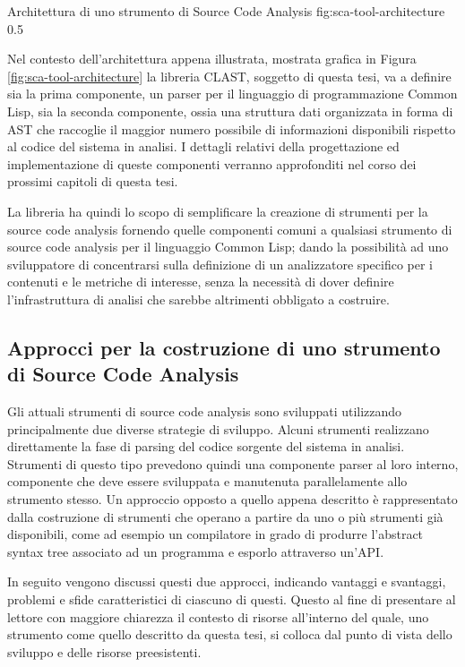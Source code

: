       {Architettura di uno strumento di Source Code Analysis}
      {fig:sca-tool-architecture}
      {0.5}

Nel contesto dell'architettura appena illustrata, mostrata grafica in Figura
\ref{fig:sca-tool-architecture} la libreria CLAST, soggetto di questa tesi, va a
definire sia la prima componente, un parser per il linguaggio di programmazione
Common Lisp, sia la seconda componente, ossia una struttura dati organizzata in
forma di AST che raccoglie il maggior numero possibile di informazioni
disponibili rispetto al codice del sistema in analisi. I dettagli relativi della
progettazione ed implementazione di queste componenti verranno approfonditi nel
corso dei prossimi capitoli di questa tesi.

La libreria ha quindi lo scopo di semplificare la creazione di strumenti per la
source code analysis fornendo quelle componenti comuni a qualsiasi strumento di
source code analysis per il linguaggio Common Lisp; dando la possibilità ad uno
sviluppatore di concentrarsi sulla definizione di un analizzatore specifico per
i contenuti e le metriche di interesse, senza la necessità di dover definire
l'infrastruttura di analisi che sarebbe altrimenti obbligato a costruire.

\subsection{Approcci per la costruzione di uno strumento di Source Code
Analysis}
\label{sca-approches}

Gli attuali strumenti di source code analysis sono sviluppati utilizzando
principalmente due diverse strategie di sviluppo. Alcuni strumenti realizzano
direttamente la fase di parsing del codice sorgente del sistema in analisi.
Strumenti di questo tipo prevedono quindi una componente parser al loro interno,
componente che deve essere sviluppata e manutenuta parallelamente allo strumento
stesso. Un approccio opposto a quello appena descritto è rappresentato dalla
costruzione di strumenti che operano a partire da uno o più strumenti già
disponibili, come ad esempio un compilatore in grado di produrre l'abstract
syntax tree associato ad un programma e esporlo attraverso un’API.

In seguito vengono discussi questi due approcci, indicando vantaggi e
svantaggi, problemi e sfide caratteristici di ciascuno di questi. Questo al
fine di presentare al lettore con maggiore chiarezza il contesto di risorse
all’interno del quale, uno strumento come quello descritto da questa tesi, si
colloca dal punto di vista dello sviluppo e delle risorse preesistenti.\\

